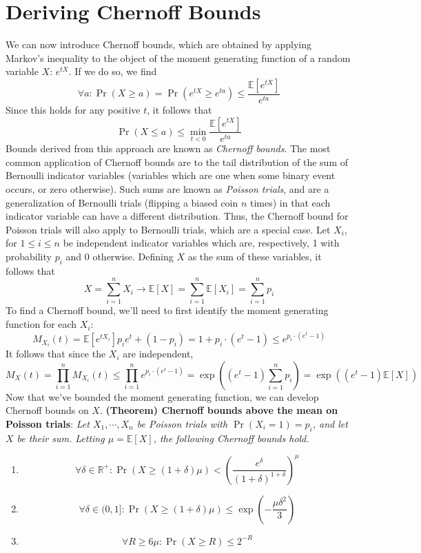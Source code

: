 \documentclass{article}
\newcommand*{\tb}{\textbf}
\newcommand*{\ti}{\textit}
\newcommand*{\nn}{\newline \newline}
\newcommand*{\R}{\mathbb{R}}
\newcommand*{\E}{\mathbb{E}}
\begin{document}
\section{Deriving Chernoff Bounds}
We can now introduce Chernoff bounds, which are obtained by applying Markov's inequality to the object of the moment generating function of a random variable $ X $: $ e^{t X} $. If we do so, we find
$$ \forall a: \Pr(X \geq a) = \Pr(e^{t X} \geq e^{t a}) \leq \frac{\E[e^{t X}]}{e^{t a}} $$
Since this holds for any positive $ t $, it follows that
$$ \Pr(X \leq a) \leq \min_{t < 0} \frac{\E[e^{t X}]}{e^{t a}} $$
Bounds derived from this approach are known as \ti{Chernoff bounds}. The most common application of Chernoff bounds are to the tail distribution of the sum of Bernoulli indicator variables (variables which are one when some binary event occurs, or zero otherwise). Such sums are known as \ti{Poisson trials}, and are a generalization of Bernoulli trials (flipping a biased coin $ n $ times) in that each indicator variable can have a different distribution. Thus, the Chernoff bound for Poisson trials will also apply to Bernoulli trials, which are a special case. Let $ X_i $, for $ 1 \leq i \leq n $ be independent indicator variables which are, respectively, 1 with probability $ p_i $ and 0 otherwise. Defining $ X $ as the sum of these variables, it follows that
$$ X = \sum_{i = 1}^n X_i \rightarrow \E[X] = \sum_{i = 1}^n \E[X_i] = \sum_{i = 1}^n p_i $$
To find a Chernoff bound, we'll need to first identify the moment generating function for each $ X_i $:
$$ M_{X_i}(t) = \E[e^{t X_i}] p_i e^t + (1 - p_i) = 1 + p_i \cdot (e^t - 1) \leq e^{p_i \cdot (e^t - 1)} $$
It follows that since the $ X_i $ are independent,
$$ M_X(t) = \prod_{i = 1}^n M_{X_i}(t) \leq \prod_{i = 1}^n e^{p_i \cdot (e^t - 1)} = \exp \left( (e^t - 1) \sum_{i = 1}^n p_i  \right) = \exp ( (e^t - 1) \E[X] ) $$
Now that we've bounded the moment generating function, we can develop Chernoff bounds on $ X $.
\nn
\tb{(Theorem) Chernoff bounds above the mean on Poisson trials}: \ti{Let $ X_1, \cdots, X_n $ be Poisson trials with $ \Pr(X_i = 1) = p_i $, and let $ X $ be their sum. Letting $ \mu = \E[X] $, the following Chernoff bounds hold.}
\begin{enumerate}
    \item $$ \forall \delta \in \R^+: \Pr(X \geq (1 + \delta) \mu) < \left( \frac{e^\delta}{(1 + \delta)^{1 + \delta}} \right)^{\mu} $$
    \item $$ \forall \delta \in (0, 1]: \Pr(X \geq (1 + \delta) \mu) \leq \exp \left( - \frac{\mu \delta^2}{3} \right) $$
    \item $$ \forall R \geq 6 \mu: \Pr(X \geq R) \leq 2^{-R} $$
\end{enumerate}
\end{document}
